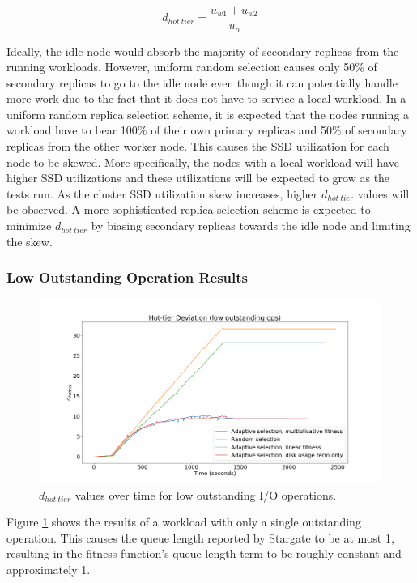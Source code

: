 \documentclass[12pt]{article}
\begin{document}
  \begin{equation}
    d_{hot\ tier} = \frac{u_{w1} + u_{w2}}{u_{o}}
  \end{equation}
  
  Ideally, the idle node would absorb the majority of secondary replicas from
  the running workloads. However, uniform random selection causes only 50\% of
  secondary replicas to go to the idle node even though it can potentially
  handle more work due to the fact that it does not have to service a local
  workload. In a uniform random replica selection scheme, it is expected that
  the nodes running a workload have to bear 100\% of their own primary replicas
  and 50\% of secondary replicas from the other worker node. This causes the
  SSD utilization for each node to be skewed. More specifically, the nodes with
  a local workload will have higher SSD utilizations and these utilizations
  will be expected to grow as the tests run. As the cluster SSD utilization
  skew increases, higher $d_{hot\ tier}$ values will be observed.  A more
  sophisticated replica selection scheme is expected to minimize $d_{hot\
  tier}$ by biasing secondary replicas towards the idle node and limiting the
  skew.

    \subsubsection{Low Outstanding Operation Results}

    \begin{figure}[htbp]
      \centering
      \includegraphics[scale=0.32]{images/low_outstanding_exp.png} 
      \caption{$d_{hot\ tier}$ values over time for low outstanding I/O
               operations.}
      \label{fig:low_outstanding_tier_disparity}
    \end{figure}

    Figure \ref{fig:low_outstanding_tier_disparity} shows the results of a
    workload with only a single outstanding operation. This causes the queue
    length reported by Stargate to be at most 1, resulting in the fitness
    function's queue length term to be roughly constant and approximately 1.
    
\end{document}
